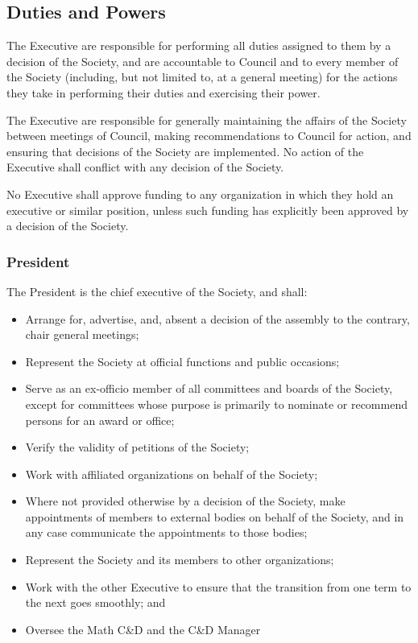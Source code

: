 \subsection{Duties and Powers}
The Executive are responsible for performing all duties assigned to them by a
decision of the Society, and are accountable to Council and to every member of
the Society (including, but not limited to, at a general meeting) for the
actions they take in performing their
duties and exercising their power.

The Executive are responsible for generally maintaining the affairs of the
Society between meetings of Council, making recommendations to Council for
action, and ensuring that decisions of the Society are implemented. No action of
the Executive shall conflict with any decision of the Society.

No Executive shall approve funding to any organization in which they hold an
executive or similar position, unless such funding has explicitly been approved
by a decision of the Society.

\subsubsection{President}
The President is the chief executive of the Society, and shall:
\begin{itemize}
  \item Arrange for, advertise, and, absent a decision of the assembly to the
    contrary, chair general meetings;
  \item Represent the Society at official functions and public occasions;
  \item Serve as an ex-officio member of all committees and boards of the
    Society, except for committees whose purpose is primarily to nominate or
    recommend persons for an award or office;
  \item Verify the validity of petitions of the Society;
  \item Work with affiliated organizations on behalf of the Society;
  \item Where not provided otherwise by a decision of the Society, make
    appointments of members to external bodies on behalf of the Society, and in
    any case communicate the appointments to those bodies;
  \item Represent the Society and its members to other organizations;
  \item Work with the other Executive to ensure that the transition from one
    term to the next goes smoothly; and
  \item Oversee the Math C\&D and the C\&D Manager
\end{itemize}

